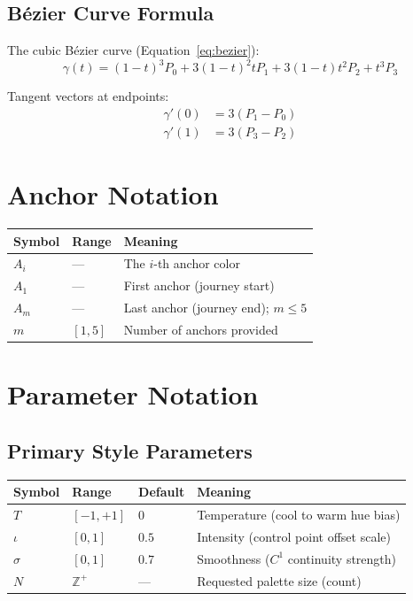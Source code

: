 \subsection{Bézier Curve Formula}

The cubic Bézier curve (Equation~\ref{eq:bezier}):
\begin{equation*}
    \gamma(t) = (1-t)^3 P_0 + 3(1-t)^2 t P_1 + 3(1-t) t^2 P_2 + t^3 P_3
\end{equation*}

Tangent vectors at endpoints:
\begin{align*}
    \gamma'(0) &= 3(P_1 - P_0) \\
    \gamma'(1) &= 3(P_3 - P_2)
\end{align*}

\section{Anchor Notation}
\label{sec:notation-anchors}

\begin{center}
\begin{tabular}{lll}
  \toprule
  \textbf{Symbol} & \textbf{Range} & \textbf{Meaning} \\
  \midrule
  $A_i$ & --- & The $i$-th anchor color \\
  $A_1$ & --- & First anchor (journey start) \\
  $A_m$ & --- & Last anchor (journey end); $m \leq 5$ \\
  $m$ & $[1, 5]$ & Number of anchors provided \\
  \bottomrule
\end{tabular}
\end{center}

\section{Parameter Notation}
\label{sec:notation-params}

\subsection{Primary Style Parameters}

\begin{center}
\begin{tabular}{llll}
  \toprule
  \textbf{Symbol} & \textbf{Range} & \textbf{Default} & \textbf{Meaning} \\
  \midrule
  $T$ & $[-1, +1]$ & $0$ & Temperature (cool to warm hue bias) \\
  $\iota$ & $[0, 1]$ & $0.5$ & Intensity (control point offset scale) \\
  $\sigma$ & $[0, 1]$ & $0.7$ & Smoothness ($C^1$ continuity strength) \\
  $N$ & $\mathbb{Z}^+$ & --- & Requested palette size (count) \\
  \bottomrule
\end{tabular}
\end{center}

